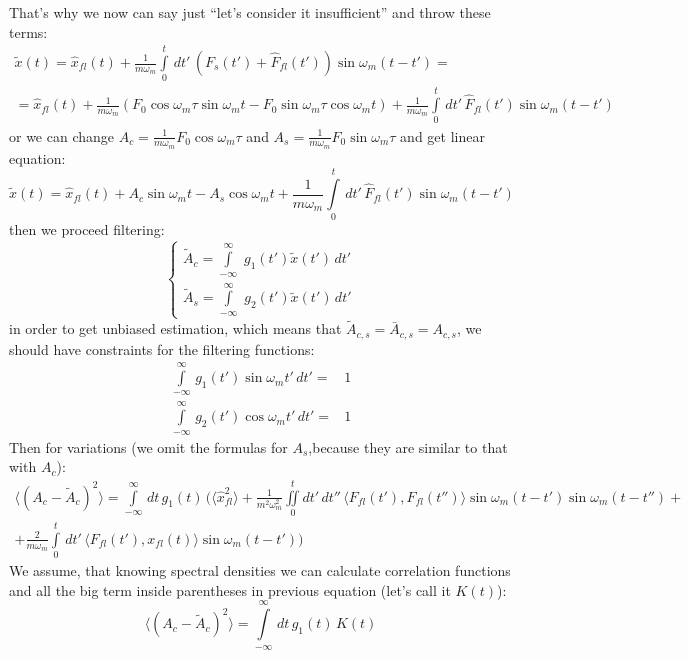 \documentclass[notitlepage,a4paper,11pt,hyperref=pdftex]{revtex4-1}
\newcommand{\mean}[1]{\langle#1\rangle}
\newcommand{\I}[2]{\int\limits_{#1}^{#2}\,}
\begin{document}
That's why we now can say just ``let's consider it insufficient'' and throw these terms:
\begin{multline}
 \tilde{x}(t) = \hat{x}_{fl}(t) + \frac{1}{m\omega_m}\I{0}{t}dt'\,(F_s(t') + \hat{F}_{fl}(t'))\sin\omega_m(t-t') =\\
= \hat{x}_{fl}(t) + \frac{1}{m\omega_m}(F_0\cos\omega_m\tau \sin\omega_mt - F_0\sin\omega_m\tau\cos\omega_mt) + \frac{1}{m\omega_m}\I{0}{t}dt'\,\hat{F}_{fl}(t')\sin\omega_m(t-t')
\end{multline}
or we can change $A_c = \frac{1}{m\omega_m}F_0\cos\omega_m\tau$ and $A_s = \frac{1}{m\omega_m}F_0\sin\omega_m\tau$ and get linear equation:
\begin{equation}
 \tilde{x}(t)=\hat{x}_{fl}(t) + A_c\sin\omega_mt - A_s\cos\omega_mt + \frac{1}{m\omega_m}\I{0}{t}dt'\,\hat{F}_{fl}(t')\sin\omega_m(t-t')
\end{equation}
then we proceed filtering:
\begin{equation}
 \begin{cases}
  \tilde{A}_c = \I{-\infty}{\infty}\,g_1(t')\tilde{x}(t')\,dt'\\
\tilde{A}_s = \I{-\infty}{\infty}\,g_2(t')\tilde{x}(t')\,dt'
 \end{cases}
\end{equation}
in order to get unbiased estimation, which means that $\tilde{A}_{c,s} = \bar{A}_{c,s} = A_{c,s}$, we should have constraints for the filtering functions:
\begin{align}
 \I{-\infty}{\infty}g_1(t')\sin\omega_mt'\,dt' =& 1\\
 \I{-\infty}{\infty}g_2(t')\cos\omega_mt'\,dt' =&1
\end{align}
Then for variations (we omit the formulas for $A_s$,because they are similar to that with $A_c$):
\begin{multline}
 \mean{(A_c-\tilde{A}_c)^2} = \I{-\infty}{\infty}dt\,g_1(t)\,\bigl(\mean{\hat{x}_{fl}^2} +\frac{1}{m^2\omega_m^2}\iint\limits_{0}^{t}dt'\,dt''\,\mean{F_{fl}(t'),F_{fl}(t'')}\sin\omega_m(t-t')\sin\omega_m(t-t'')+\\
+ \frac{2}{m\omega_m}\I{0}{t}dt'\,\mean{F_{fl}(t'),x_{fl}(t)}\sin\omega_m(t-t')\bigr) 
\end{multline}
We assume, that knowing spectral densities we can calculate correlation functions and all the big term inside parentheses in previous equation (let's call it $K(t)$):
\begin{equation}
 \mean{(A_c-\tilde{A}_c)^2} = \I{-\infty}{\infty}dt\,g_1(t)\,K(t)
\end{equation}
\end{document}

